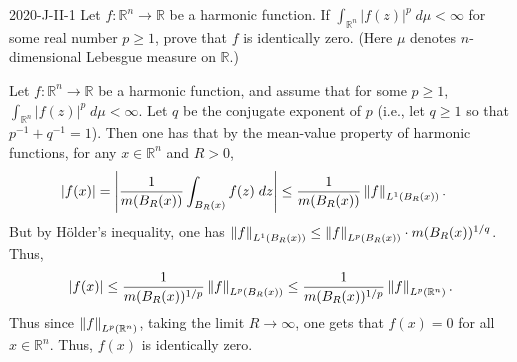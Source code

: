 \documentclass{article}
\begin{document}
	\begin{prb}{2020-J-II-1}
		Let $f: \mathbb{R}^n \to \mathbb{R}$ be a harmonic function. If $\int_{\mathbb{R}^n}|f(z)|^{p}\;d\mu < \infty$ for some real number $p \geq 1$, prove that $f$ is identically zero. (Here $\mu$ denotes $n$-dimensional Lebesgue measure on $\mathbb{R}$.)
	\end{prb}
	Let $f: \mathbb{R}^n \to \mathbb{R}$ be a harmonic function, and assume that for some $p \geq 1$, $\int_{\mathbb{R}^n}|f(z)|^{p}\;d\mu < \infty$. Let $q$ be the conjugate exponent of $p$ (i.e., let $q \geq 1$ so that $p^{-1} + q^{-1} = 1$). Then one has that by the mean-value property of harmonic functions, for any $x \in \mathbb{R}^n$ and $R > 0$, 
	\begin{align*}
		\begin{split}
			|f(x)| &= \left| \frac{1}{m(B_{R}(x))} \int_{B_{R}(x)}f(z)\;dz \right| \leq \frac{1}{m(B_{R}(x))}\left\Vert f \right\Vert_{L^1(B_{R}(x))}. 
		\end{split}
	\end{align*}
	But by H\"older's inequality, one has $\left\Vert f \right\Vert_{L^1(B_{R}(x))} \leq \left\Vert f \right\Vert_{L^p(B_{R}(x))} \cdot m(B_{R}(x))^{1/q}$. Thus, 
	\begin{align*}
		\begin{split}
			|f(x)| \leq \frac{1}{m(B_{R}(x))^{1/p}}\left\Vert f \right\Vert_{L^{p}(B_{R}(x))} \leq \frac{1}{m(B_{R}(x))^{1/p}}\left\Vert f \right\Vert_{L^{p}(\mathbb{R}^n)}. 
		\end{split} 
	\end{align*}
	Thus since $\left\Vert f \right\Vert_{L^p(\mathbb{R}^n)}$, taking the limit $R \to \infty$, one gets that $f(x) = 0$ for all $x \in \mathbb{R}^n$. Thus, $f(x)$ is identically zero. 
	
\end{document}
